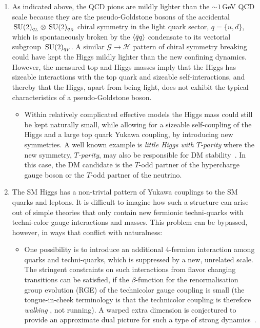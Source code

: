 \begin{enumerate}
\item As indicated above, the QCD pions are mildly lighter than the $\sim1$\,GeV QCD scale because they are the pseudo-Goldstone bosons of the accidental $\,{\rm SU}(2)_{q_L}\otimes\,{\rm SU}(2)_{q_R}$
chiral symmetry in the light quark sector, $q=\{u,d\}$, which is spontaneously broken by the  $\langle \bar q q\rangle$ condensate to its vectorial subgroup $\,{\rm SU}(2)_{q_V}$.
A similar $\mathcal{G}\to \mathcal{H}$ pattern of chiral symmetry breaking could have kept the Higgs mildly lighter than the new confining dynamics.
However, the measured top and Higgs masses imply that the Higgs 
has sizeable interactions with the top quark and sizeable self-interactions,
and thereby that the Higgs, apart from being light, does not exhibit the typical characteristics of a pseudo-Goldstone boson.
\begin{itemize}
\item[$\circ$] Within relatively complicated effective models the Higgs mass could still be kept naturally small,
while allowing for a sizeable self-coupling of the Higgs and a large top quark Yukawa coupling, by introducing new symmetries. A well known example is {\em little Higgs with $T$-parity} where the new symmetry, {\em $T$-parity}, may also be responsible for DM stability~\cite{littleHiggs}.
In this case, the DM candidate is the $T$-odd partner of the hypercharge gauge boson or the $T$-odd partner of the neutrino.
\end{itemize}

\item The SM Higgs has a non-trivial pattern of Yukawa couplings to the SM quarks and leptons.
It is difficult to imagine how such a structure can arise out of simple
theories that only contain new fermionic techni-quarks with techni-color gauge interactions and masses. 
This problem can be bypassed, however,  in ways that conflict with naturalness:
\begin{itemize}
\item[$\circ$] One possibility is to introduce an additional 4-fermion interaction among quarks and techni-quarks, 
which is suppressed by a new, unrelated scale.
The stringent constraints on such interactions from flavor changing transitions 
can be satisfied, if the $\beta$-function for the renormalisation group evolution (RGE) of the technicolor gauge coupling is small 
(the tongue-in-cheek terminology is that the technicolor coupling is therefore {\em walking} \cite{walking:TC}, not running).
A warped extra dimension is conjectured to provide an approximate dual picture for such a type of strong dynamics~\cite{AdS/CFT}.


\end{itemize}
\end{enumerate}
